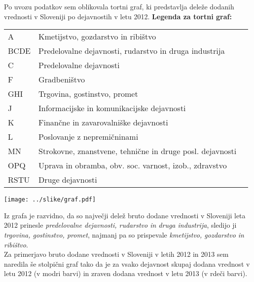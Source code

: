 \documentclass[a4paper, 11pt]{article}
\begin{document}
Po uvozu podatkov sem oblikovala tortni graf, ki predstavlja deleže dodanih vrednosti v Sloveniji po dejavnostih v letu 2012.
\newpage
\textbf{Legenda za tortni graf:}
\begin{table}[h]
\begin{tabular}{lll}
A & Kmetijstvo, gozdarstvo in ribištvo \\
BCDE & Predelovalne dejavnosti, rudarstvo in druga industrija \\
C & Predelovalne dejavnosti \\
F & Gradbeništvo \\
GHI & Trgovina, gostinstvo, promet \\
J & Informacijske in komunikacijske dejavnosti\\
K & Finančne in zavarovalniške dejavnosti\\
L & Poslovanje z nepremičninami \\
MN & Strokovne, znanstvene, tehnične in druge posl. dejavnosti \\
OPQ & Uprava in obramba, obv. soc. varnost, izob., zdravstvo \\
RSTU & Druge dejavnosti
\end{tabular}
\end{table}

\begin{center}
\texttt{[image: ../slike/graf.pdf]}
\end{center}


Iz grafa je razvidno, da so največji dele\-ž bruto dodane vrednosti v Sloveniji leta 2012 prinesle \textit{predelovalne dejavnosti, rudarstvo in
druga industrija}, sledijo ji \textit{trgovina, gostinstvo, promet}, najmanj pa so prispevale \textit{kmetijstvo, gozdarstvo in ribi\-štvo}. \\
Za primerjavo bruto dodane vrednosti v Sloveniji v letih 2012 in 2013 sem naredila še stolpični graf tako da je za vsako dejavnost skupaj dodana vrednost v letu 2012 (v  modri barvi) in zraven dodana vrednost v letu 2013 (v rdeči barvi).\\
\end{document}
